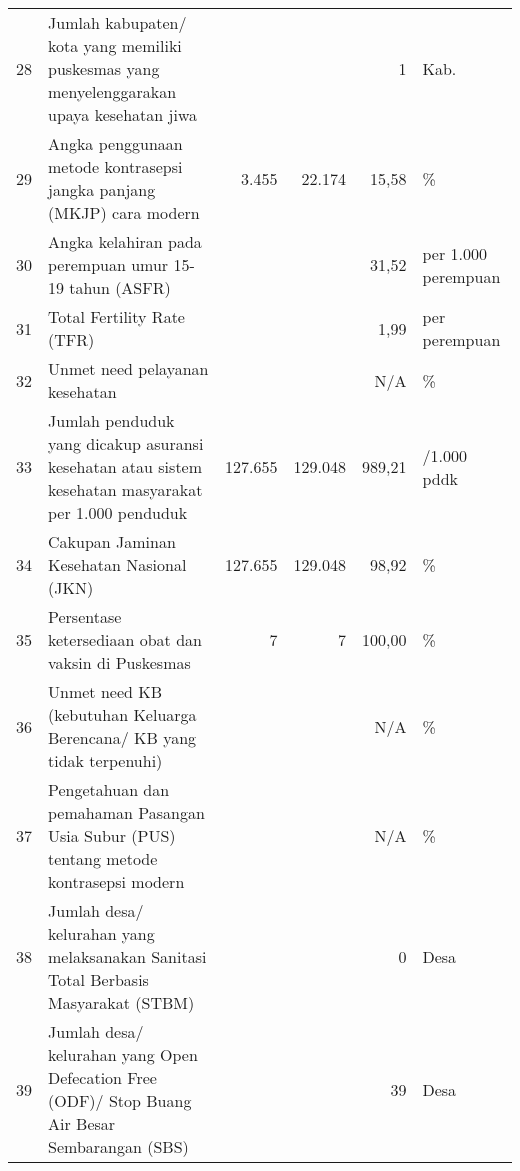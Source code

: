 \begin{center}
\begin{longtable}{rY{12em}rrrY{6em}}
                   28 & Jumlah kabupaten/ kota yang memiliki puskesmas yang menyelenggarakan upaya kesehatan jiwa                                     &         &         &      1 & Kab.                \\
                   29 & Angka penggunaan metode kontrasepsi jangka panjang (MKJP) cara modern                                                          					&   3.455 &  22.174 &  15,58 & \%                  \\
                   30 & Angka kelahiran pada perempuan umur 15-19 tahun (ASFR)                                                                        &         &         &  31,52 & per 1.000 perempuan \\
                   31 & Total Fertility Rate (TFR)                                                                                                     					&         &         &   1,99 & per perempuan       \\
                   32 & Unmet need pelayanan kesehatan                                                                                                &         &         &    N/A & \%                  \\
                   33 & Jumlah penduduk yang dicakup asuransi kesehatan atau sistem kesehatan masyarakat per 1.000 penduduk                            					& 127.655 & 129.048 & 989,21 & /1.000 pddk         \\
                   34 & Cakupan Jaminan Kesehatan Nasional (JKN)                                                                                      & 127.655 & 129.048 &  98,92 & \%                  \\
                   35 & Persentase ketersediaan obat dan vaksin di Puskesmas                                                                           					&       7 &       7 &  100,00 & \%                  \\
                   36 & Unmet need KB (kebutuhan Keluarga Berencana/ KB yang tidak terpenuhi)                                                         &         &         &    N/A & \%                  \\
                   37 & Pengetahuan dan pemahaman Pasangan Usia Subur (PUS) tentang metode kontrasepsi modern                                          					&         &         &    N/A & \%                  \\
                   38 & Jumlah desa/ kelurahan yang melaksanakan Sanitasi Total Berbasis Masyarakat (STBM)                                            &         &         &      0 & Desa                \\
                   39 & Jumlah desa/ kelurahan yang Open Defecation Free (ODF)/ Stop Buang Air Besar Sembarangan (SBS)                                 					&         &         &     39 & Desa \\
\bottomrule
\end{longtable}
\par\end{center}
